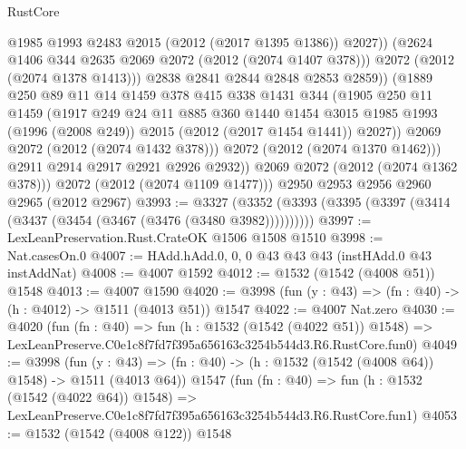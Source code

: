 \begin{lexlean}{RustCore}
\begin{coremodule}
                        @1985
                        @1993
                        @2483
                        @2015
                        (@2012 (@2017 @1395 @1386))
                        @2027))
                    (@2624 @1406 @344 @2635 @2069 @2072 (@2012 (@2074 @1407 @378)))
                    @2072
                    (@2012 (@2074 @1378 @1413)))
                  @2838
                  @2841
                  @2844
                  @2848
                  @2853
                  @2859))
              (@1889
                @250
                @89
                @11
                @14
                @1459
                @378
                @415
                @338
                @1431
                @344
                (@1905
                  @250
                  @11
                  @1459
                  (@1917
                    @249
                    @24
                    @11
                    @885
                    @360
                    @1440
                    @1454
                    @3015
                    @1985
                    @1993
                    (@1996 (@2008 @249))
                    @2015
                    (@2012 (@2017 @1454 @1441))
                    @2027))
                @2069
                @2072
                (@2012 (@2074 @1432 @378)))
              @2072
              (@2012 (@2074 @1370 @1462)))
            @2911
            @2914
            @2917
            @2921
            @2926
            @2932))
        @2069
        @2072
        (@2012 (@2074 @1362 @378)))
      @2072
      (@2012 (@2074 @1109 @1477)))
    @2950
    @2953
    @2956
    @2960
    @2965
    (@2012 @2967)
@3993 := @3327 (@3352 (@3393 (@3395 (@3397 (@3414 (@3437 (@3454 (@3467 (@3476 (@3480 @3982))))))))))
@3997 := LexLeanPreservation.Rust.CrateOK @1506 @1508 @1510
@3998 := Nat.casesOn.{0}
@4007 := HAdd.hAdd.{0, 0, 0} @43 @43 @43 (instHAdd.{0} @43 instAddNat)
@4008 := @4007 @1592
@4012 := @1532 (@1542 (@4008 @51)) @1548
@4013 := @4007 @1590
@4020 := @3998 (fun (y : @43) => (fn : @40) -> (h : @4012) -> @1511 (@4013 @51)) @1547
@4022 := @4007 Nat.zero
@4030 := @4020
    (fun (fn : @40) =>
    fun (h : @1532 (@1542 (@4022 @51)) @1548) =>
    LexLeanPreserve.C0e1c8f7fd7f395a656163c3254b544d3.R6.RustCore.fun0)
@4049 := @3998
    (fun (y : @43) => (fn : @40) -> (h : @1532 (@1542 (@4008 @64)) @1548) -> @1511 (@4013 @64))
    @1547
    (fun (fn : @40) =>
    fun (h : @1532 (@1542 (@4022 @64)) @1548) =>
    LexLeanPreserve.C0e1c8f7fd7f395a656163c3254b544d3.R6.RustCore.fun1)
@4053 := @1532 (@1542 (@4008 @122)) @1548

\end{coremodule}
\end{lexlean}
